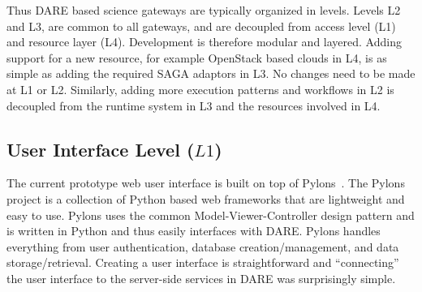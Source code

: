 \documentclass[]{svjour3}
\begin{document}
Thus DARE based science gateways are typically organized in levels.
Levels L2 and L3, are common to all gateways, and are decoupled from
access level (L1) and resource layer (L4). Development is therefore
modular and layered. Adding support for a new resource, for example
OpenStack based clouds in L4, is as simple as adding the required SAGA
adaptors in L3. No changes need to be made at L1 or L2. Similarly,
adding more execution patterns and workflows in L2 is decoupled
from the runtime system in L3 and the resources involved in L4.


\subsection{User Interface Level ($L1$)}
The current prototype web user interface is built on top of
Pylons~\cite{pylons_website}. The Pylons project is a collection of
Python based web frameworks that are lightweight and easy to use. Pylons
uses the common Model-Viewer-Controller design pattern and is written
in Python and thus easily interfaces with DARE. Pylons handles everything
from user authentication, database creation/management,
and data storage/retrieval. Creating a user interface is straightforward
and ``connecting'' the user interface to the server-side services in DARE
was surprisingly simple.


\end{document}
